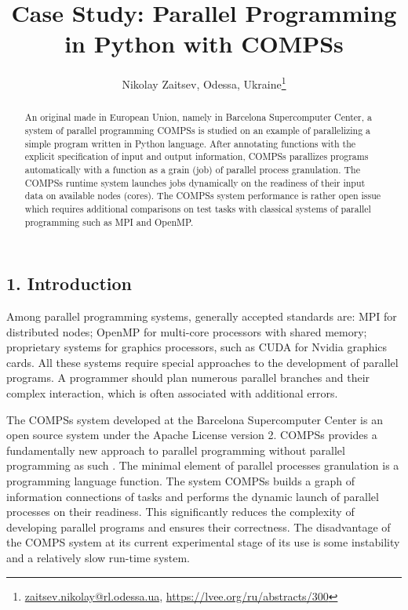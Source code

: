 \documentclass[10pt, a5paper]{article}
\begin{document}
\title{Case Study: Parallel Programming in Python with COMPSs}
\author{Nikolay Zaitsev, Odessa, Ukraine\footnote{\url{zaitsev.nikolay@rl.odessa.ua}, \url {https://lvee.org/ru/abstracts/300}}}
\maketitle
\begin{abstract}
An original made in European Union, namely in Barcelona Supercomputer Center, a system of parallel programming \linebreak COMPSs is studied on an example of parallelizing a simple program written in Python language. After annotating functions with the explicit specification of input and output information, COMPSs parallizes programs automatically with a function as a grain (job) of parallel process granulation. The COMPSs runtime system launches jobs dynamically on the readiness of their input data on available nodes (cores). The COMPSs system perfor\-mance is rather open issue which requires additional comparisons on test tasks with classical systems of parallel programming such as MPI and OpenMP.
\end{abstract}
\subsection*{1. Introduction}

Among parallel programming systems, generally accepted standards are: MPI for distributed nodes;  OpenMP for multi-core processors with shared memory; proprietary systems for graphics processors, such as CUDA for Nvidia graphics cards. All these systems require special approaches to the development of parallel programs. A programmer should plan numerous parallel branches and their complex interaction, which is often associated with additional errors.

The COMPSs system \cite{bib1} developed at the Barcelona Supercomputer Center is an open source system under the Apache License version 2. COMPSs provides a fundamentally new approach to parallel programming without parallel programming as such \cite{bib2}. The minimal ele\-ment of parallel processes granulation is a programming language func\-tion. The system COMPSs builds a graph of information connections of tasks and performs the dynamic launch of parallel processes on their readiness. This significantly reduces the complexity of developing parallel programs and ensures their correctness. The disadvantage of the COMPS system at its current experimental stage of its use is some instability and a relatively slow run-time system.
\end{document}
